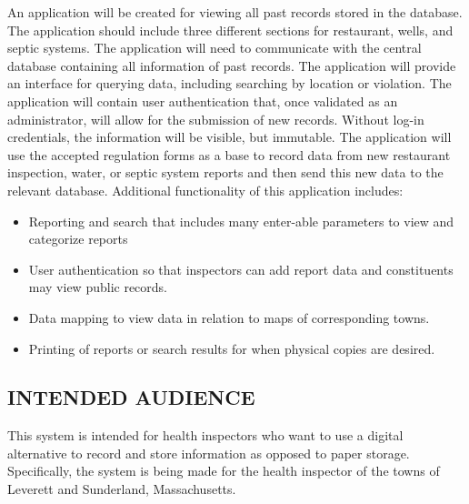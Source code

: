 \documentclass[twoside,letterpaper]{article}
\begin{document}
{An application will be created for viewing all past records stored in the database. The application should include three different sections for restaurant, wells, and septic systems.  The application will need to communicate with the central database containing all information of past records. The application will provide an interface for querying data, including searching by location or violation. The application will contain user authentication that, once validated as an administrator, will allow for the submission of new records. Without log-in credentials, the information will be visible, but immutable. The application will use the accepted regulation forms as a base to record data from new restaurant inspection, water, or septic system reports and then send this new data to the relevant database. Additional functionality of this application includes:
\newline 
\begin{itemize}
\item{Reporting and search that includes many enter-able parameters to view and categorize reports}
\item{User authentication so that inspectors can add report data and constituents may view public records.}
\item{Data mapping to view data in relation to maps of corresponding towns.}
\item{Printing of reports or search results for when physical copies are desired.}
\end{itemize}
}

\subsection[INTENDED AUDIENCE]{\rmfamily\bfseries\color{black}
INTENDED AUDIENCE}
{\rmfamily\color{black}
    This system is intended for health inspectors who want to use a digital alternative to record and store information as opposed to paper storage. Specifically, the system is being made for the health inspector of the towns of Leverett and Sunderland, Massachusetts.}
\end{document}
